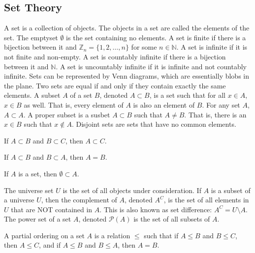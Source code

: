 \documentclass[crop=false,class=article,oneside]{standalone}
\begin{document}
    \subsection{Set Theory}
        A set is a collection of objects. The objects in a
        set are called the elements of the set. The emptyset
        $\emptyset$ is the set containing no elements. A set
        is finite if there is a bijection between it
        and $\mathbb{Z}_{n}=\{1,2,\hdots,n\}$ for some
        $n\in\mathbb{N}$. A set is infinite if it is
        not finite and non-empty.
        A set is countably infinite if there is a bijection
        between it and $\mathbb{N}$. A set is uncountably
        infinite if it is infinite and not
        countably infinite. Sets can be represented by
        Venn diagrams, which are essentially blobs in
        the plane. Two sets are equal if and only if they
        contain exactly the same elements. A subset $A$ of
        a set $B$, denoted $A\subset{B}$, is a set such that
        for all $x\in{A}$, $x\in{B}$ as well. That is, every
        element of $A$ is also an element of $B$. For any
        set $A$, $A\subset{A}$. A proper subset is a susbet
        $A\subset{B}$ such that $A\ne{B}$. That is, there is
        an $x\in{B}$ such that $x\notin{A}$. Disjoint sets
        are sets that have no common elements.
        \begin{theorem}
            If $A\subset{B}$ and $B\subset{C}$,
            then $A\subset{C}$.
        \end{theorem}
        \begin{theorem}
            If $A\subset{B}$ and $B\subset{A}$, then
            $A=B$.
        \end{theorem}
        \begin{theorem}
            If $A$ is a set, then $\emptyset\subset{A}$.
        \end{theorem}
        The universe set $U$ is the set of all objects under
        consideration. If $A$ is a subset of a universe $U$,
        then the complement of $A$, denoted $A^{C}$, is the
        set of all elements in $U$ that are NOT contained
        in $A$. This is also known as set difference:
        $A^{C}=U\setminus{A}$. The power set of a set $A$,
        denoted $\mathcal{P}(A)$ is the set of all subsets
        of $A$.
        \begin{definition}
            A partial ordering on a set $A$ is a
            relation $\leq$ such that if
            $A\leq{B}$ and $B\leq{C}$, then
            $A\leq{C}$, and if $A\leq{B}$ and
            $B\leq{A}$, then $A=B$.
        \end{definition}
\end{document}
